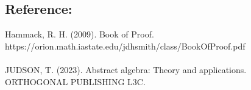 \documentclass[sigconf]{article}
\begin{document}
\subsection*{Reference:}
Hammack, R. H. (2009). Book of Proof.\\ https://orion.math.iastate.edu/jdhsmith/class/BookOfProof.pdf
\\
\\
JUDSON, T. (2023). Abstract algebra: Theory and applications. ORTHOGONAL PUBLISHING L3C.



\end{document}
